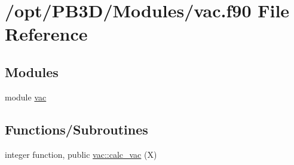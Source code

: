 \hypertarget{vac_8f90}{}\section{/opt/\+P\+B3\+D/\+Modules/vac.f90 File Reference}
\label{vac_8f90}
\subsection*{Modules}
\begin{DoxyCompactItemize}
\item 
module \hyperlink{namespacevac}{vac}
\end{DoxyCompactItemize}
\subsection*{Functions/\+Subroutines}
\begin{DoxyCompactItemize}
\item 
integer function, public \hyperlink{namespacevac_a1a1c56e4a52cb5e3f3ee1e307e374c26}{vac\+::calc\+\_\+vac} (X)
\end{DoxyCompactItemize}
